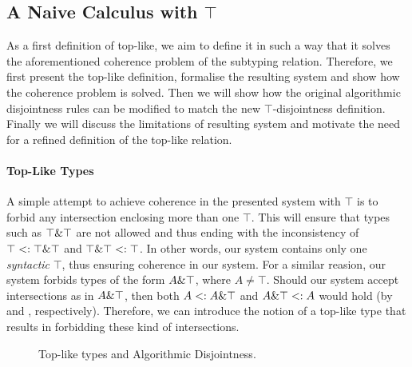 \subsection{A Naive Calculus with $\top$}

As a first definition of top-like, we aim to define it in such a way that it solves the aforementioned coherence problem of
the subtyping relation.
Therefore, we first present the top-like definition, formalise the resulting system and  
show how the coherence problem is solved.
Then we will show how the original algorithmic disjointness rules can be modified to match the new $\top$-disjointness
definition.
Finally we will discuss the limitations of resulting system and motivate the need for a refined definition of the top-like 
relation. 

\paragraph{Top-Like Types}

A simple attempt to achieve coherence in the presented system with $\top$ is to forbid any intersection enclosing 
more than one $\top$.
This will ensure that types such as $\top \& \top$ are not allowed and thus ending with the inconsistency of
$\top <: \top \& \top$ and $\top \& \top <: \top$.
In other words, our system contains only one \emph{syntactic} $\top$, thus ensuring coherence in our system.
For a similar reasion, our system forbids types of the form $A \& \top$, where $A \neq \top$.  
Should our system accept intersections as in $A \& \top$, then both $A <: A \& \top$ and 
$A \& \top <: A$ would hold (by  and , respectively).
Therefore, we can introduce the notion of a top-like type that results in forbidding these kind of intersections.

\begin{figure}[h]


  \caption{Top-like types and Algorithmic Disjointness.}
  \label{fig:tltypesdis}
\end{figure}


